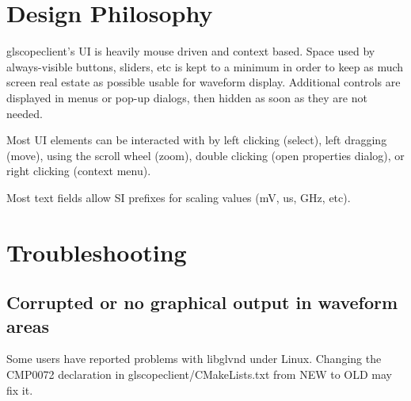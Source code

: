 \section{Design Philosophy}

glscopeclient's UI is heavily mouse driven and context based. Space used by always-visible buttons, sliders, etc is
kept to a minimum in order to keep as much screen real estate as possible usable for waveform display. Additional
controls are displayed in menus or pop-up dialogs, then hidden as soon as they are not needed.

Most UI elements can be interacted with by left clicking (select), left dragging (move), using the scroll wheel (zoom),
double clicking (open properties dialog), or right clicking (context menu).

Most text fields allow SI prefixes for scaling values (mV, us, GHz, etc).

\section{Troubleshooting}

\subsection{Corrupted or no graphical output in waveform areas}

Some users have reported problems with libglvnd under Linux. Changing the CMP0072 declaration in
glscopeclient/CMakeLists.txt from NEW to OLD may fix it.
